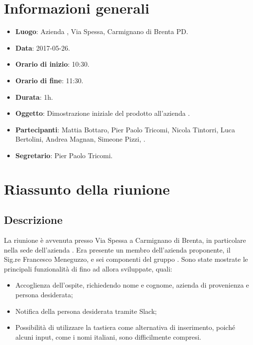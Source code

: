 \documentclass[a4paper,titlepage]{article}
\begin{document}
		
		\maketitle
		\begin{diario}
		\end{diario}
		\newpage
		\tableofcontents
		
		\newpage
		\section{Informazioni generali}
		\label{sec:Informazioni}
		
		\begin{itemize}
			\item \textbf{Luogo}: Azienda \PROPONENTE, Via Spessa, Carmignano di Brenta PD.
			\item \textbf{Data}: 2017-05-26.
			\item \textbf{Orario di inizio}: 10:30.
			\item \textbf{Orario di fine}: 11:30.
			\item \textbf{Durata}: 1h.
			\item \textbf{Oggetto}: Dimostrazione iniziale del prodotto \PROGETTO{} all'azienda \PROPONENTE.
			\item \textbf{Partecipanti}: Mattia Bottaro, Pier Paolo Tricomi, Nicola Tintorri, Luca Bertolini, Andrea Magnan, Simeone Pizzi, \PROPONENTE.
			\item \textbf{Segretario}: Pier Paolo Tricomi.
			
		\end{itemize}
		\section{Riassunto della riunione}
		\label{sec:RiassuntoRiunione}
		\subsection{Descrizione}
		La riunione è avvenuta presso Via Spessa a Carmignano di Brenta, in particolare nella sede dell'azienda \PROPONENTE. Era presente un membro dell'azienda proponente, il Sig.re Francesco Meneguzzo, e sei componenti del gruppo \GRUPPO{}. Sono state mostrate le principali funzionalità di \PROGETTO{} fino ad allora sviluppate, quali:
		\begin{itemize}
			\item Accoglienza dell'ospite, richiedendo nome e cognome, azienda di provenienza e persona desiderata;
			\item Notifica della persona desiderata tramite Slack;
			\item Possibilità di utilizzare la tastiera come alternativa di inserimento, poiché alcuni input, come i nomi italiani, sono difficilmente compresi.
		\end{itemize}
		
\end{document}
